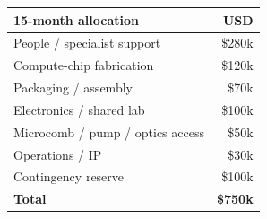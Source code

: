 \begin{tabular}{lr}
\toprule
\textbf{15-month allocation} & \textbf{USD}\\
\midrule
People / specialist support & \$280k\\
Compute-chip fabrication & \$120k\\
Packaging / assembly & \$70k\\
Electronics / shared lab & \$100k\\
Microcomb / pump / optics access & \$50k\\
Operations / IP & \$30k\\
Contingency reserve & \$100k\\
\midrule
\textbf{Total} & \textbf{\$750k}\\
\bottomrule
\end{tabular}
